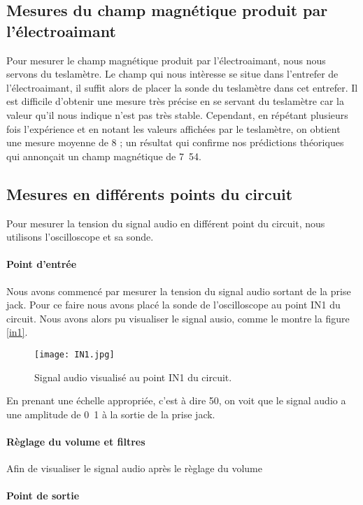 \subsection{Mesures du champ magnétique produit par l'électroaimant}
Pour mesurer le champ magnétique produit par l'électroaimant, nous nous servons du teslamètre.
Le champ qui nous intèresse se situe dans l'entrefer de l'électroaimant, il suffit alors de placer
la sonde du teslamètre dans cet entrefer. Il est difficile d'obtenir une mesure très précise en se
servant du teslamètre car la valeur qu'il nous indique n'est pas très stable. Cependant, en répétant
plusieurs fois l'expérience et en notant les valeurs affichées par le teslamètre, on obtient une mesure
moyenne de \unit{8}{\centi\tesla} ; un résultat qui confirme nos prédictions théoriques
qui annonçait un champ magnétique de \unit{7.54}{\centi\tesla}.

\subsection{Mesures en différents points du circuit}
Pour mesurer la tension du signal audio en différent point du circuit, nous utilisons l'oscilloscope
et sa sonde.

\paragraph{Point d'entrée}
Nous avons commencé par mesurer la tension du signal audio sortant de la prise jack. Pour ce faire nous avons
placé la sonde de l'oscilloscope au point IN1 du circuit. Nous avons alors pu visualiser le 
signal ausio, comme le montre la figure \ref{in1}.

\begin{figure}[!htb]
	\centering
	\texttt{[image: IN1.jpg]}
	\caption{Signal audio visualisé au point IN1 du circuit.}
\end{figure}

En prenant une échelle appropriée, c'est à dire \unit{50}{\milli\volt}, on voit que le signal 
audio a une amplitude de \unit{0.1}{\volt} à la sortie de la prise jack.

\paragraph{Règlage du volume et filtres}
Afin de visualiser le signal audio après le règlage du volume

\paragraph{Point de sortie}

